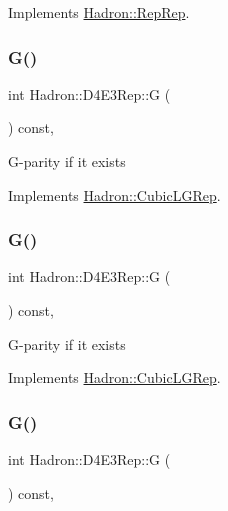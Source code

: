 Implements \mbox{\hyperlink{structHadron_1_1RepRep_a92c8802e5ed7afd7da43ccfd5b7cd92b}{Hadron\+::\+Rep\+Rep}}.

\mbox{\label{structHadron_1_1D4E3Rep_ac9cf1dd84f4cba3fc25d84f22619be44}} 
\subsubsection{\texorpdfstring{G()}{G()}\hspace{0.1cm}{\footnotesize\ttfamily [1/3]}}
{\footnotesize\ttfamily int Hadron\+::\+D4\+E3\+Rep\+::G (\begin{DoxyParamCaption}{ }\end{DoxyParamCaption}) const\hspace{0.3cm}{\ttfamily [inline]}, {\ttfamily [virtual]}}

G-\/parity if it exists 

Implements \mbox{\hyperlink{structHadron_1_1CubicLGRep_ace26f7b2d55e3a668a14cb9026da5231}{Hadron\+::\+Cubic\+L\+G\+Rep}}.

\mbox{\label{structHadron_1_1D4E3Rep_ac9cf1dd84f4cba3fc25d84f22619be44}} 
\subsubsection{\texorpdfstring{G()}{G()}\hspace{0.1cm}{\footnotesize\ttfamily [2/3]}}
{\footnotesize\ttfamily int Hadron\+::\+D4\+E3\+Rep\+::G (\begin{DoxyParamCaption}{ }\end{DoxyParamCaption}) const\hspace{0.3cm}{\ttfamily [inline]}, {\ttfamily [virtual]}}

G-\/parity if it exists 

Implements \mbox{\hyperlink{structHadron_1_1CubicLGRep_ace26f7b2d55e3a668a14cb9026da5231}{Hadron\+::\+Cubic\+L\+G\+Rep}}.

\mbox{\label{structHadron_1_1D4E3Rep_ac9cf1dd84f4cba3fc25d84f22619be44}} 
\subsubsection{\texorpdfstring{G()}{G()}\hspace{0.1cm}{\footnotesize\ttfamily [3/3]}}
{\footnotesize\ttfamily int Hadron\+::\+D4\+E3\+Rep\+::G (\begin{DoxyParamCaption}{ }\end{DoxyParamCaption}) const\hspace{0.3cm}{\ttfamily [inline]}, {\ttfamily [virtual]}}

